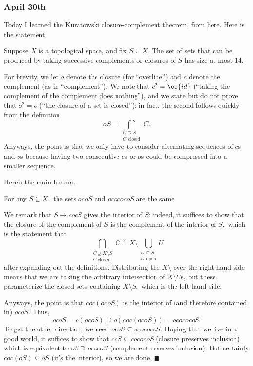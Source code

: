 \subsubsection{April 30th}
Today I learned the Kuratowski closure-complement theorem, from \href{https://web.archive.org/web/20210302053008/http://nzjm.math.auckland.ac.nz/images/6/63/The_Kuratowski_Closure-Complement_Theorem.pdf}{here}. Here is the statement.
\begin{theorem}
    Suppose $X$ is a topological space, and fix $S\subseteq X.$ The set of sets that can be produced by taking successive complements or closures of $S$ has size at most $14.$
\end{theorem}
For brevity, we let $o$ denote the closure (for ``overline'') and $c$ denote the complement (as in ``complement''). We note that $c^2=\op{id}$ (``taking the complement of the complement does nothing''), and we state but do not prove that $o^2=o$ (``the closure of a set is closed''); in fact, the second follows quickly from the definition
\[oS=\bigcap_{\substack{C\supseteq S\\C\text{ closed}}}C.\]
Anyways, the point is that we only have to consider alternating sequences of $c$s and $o$s because having two consecutive $c$s or $o$s could be compressed into a smaller sequence.

Here's the main lemma.
\begin{lemma}
    For any $S\subseteq X,$ the sets $ocoS$ and $ocococoS$ are the same.
\end{lemma}
We remark that $S\mapsto cocS$ gives the interior of $S$: indeed, it suffices to show that the closure of the complement of $S$ is the complement of the interior of $S,$ which is the statement that
\[\bigcap_{\substack{C\supseteq X\setminus S\\\text{C closed}}}C\stackrel?=X\setminus\bigcup_{\substack{U\subseteq S\\U\text{ open}}}U\]
after expanding out the definitions. Distributing the $X\setminus$ over the right-hand side means that we are taking the arbitrary intersection of $X\setminus U$s, but these parameterize the closed sets containing $X\setminus S,$ which is the left-hand side.

Anyways, the point is that $coc(ocoS)$ is the interior of (and therefore contained in) $ocoS.$ Thus,
\[ocoS=o(ocoS)\supseteq o(coc(ocoS))=ocococoS.\]
To get the other direction, we need $ocoS\subseteq ocococoS.$ Hoping that we live in a good world, it suffices to show that $coS\subseteq cococoS$ (closure preserves inclusion) which is equivalent to $oS\supseteq ococoS$ (complement reverses inclusion). But certainly $coc(oS)\subseteq oS$ (it's the interior), so we are done. $\blacksquare$

